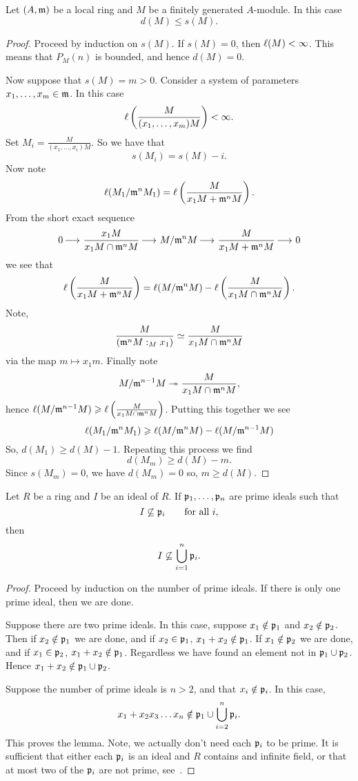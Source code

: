 \documentclass{ximera}
\begin{document}
\begin{lemma}[$\boldsymbol{d(M)\le s(M)}$]\label{L:ds}
  Let $(A,\mathfrak{m})$ be a local ring and $M$ be a finitely generated
  $A$-module. In this case
  \[
  d(M)\le s(M).
  \]
  \begin{proof}
    Proceed by induction on $s(M)$. If $s(M) = 0$, then
    $\ell(M)< \infty$. This means that $P_M(n)$ is bounded, and hence
    $d(M) = 0$.

    Now suppose that $s(M) = m >0$. Consider a system of
    parameters $x_1,\dots, x_m\in \mathfrak{m}$. In this case
    \[
    \ell\left( \frac{M}{(x_1,\dots,x_m)M} \right)<\infty.
    \]
    Set $M_i = \frac{M}{(x_1,\dots,x_i)M}$. So we have that
    \[
    s(M_i) = s(M)-i.
    \]
    Now note
    \[
    \ell(M_1/\mathfrak{m}^n M_1) = \ell\left(\frac{M}{x_1 M + \mathfrak{m}^n M}\right).
    \]
    From the short exact sequence
    \[
    0\mathop{\longrightarrow\,}\limits \frac{x_1M}{x_1 M \cap \mathfrak{m}^n M} \mathop{\longrightarrow\,}\limits  M/\mathfrak{m}^n M \mathop{\longrightarrow\,}\limits \frac{M}{x_1 M + \mathfrak{m}^n M}\mathop{\longrightarrow\,}\limits 0
    \]
    we see that
    \[
    \ell\left(\frac{M}{x_1 M + \mathfrak{m}^n M}\right) = \ell(M/\mathfrak{m}^n M) - \ell \left(\frac{M}{x_1 M \cap \mathfrak{m}^n M}\right).
    \]
    Note,
    \[
    \frac{M}{(\mathfrak{m}^nM:_M x_1)}\simeq \frac{M}{x_1 M \cap \mathfrak{m}^n M}
    \]
    via the map $m\mapsto x_1 m$. Finally note
    \[
    M/\mathfrak{m}^{n-1}M \twoheadrightarrow \frac{M}{x_1 M \cap \mathfrak{m}^n M},
    \]
    hence $\ell(M/\mathfrak{m}^{n-1}M)\geqslant \ell\left(\frac{M}{x_1 M \cap \mathfrak{m}^n
      M}\right)$. Putting this together we see
    \[
    \ell(M_1/\mathfrak{m}^n M_1) \geqslant \ell(M/\mathfrak{m}^n M) - \ell(M/\mathfrak{m}^{n-1}M)
    \]
    So, $d(M_1) \ge d(M) - 1$. Repeating this process we find
    \[
    d(M_m) \ge d(M) -m.
    \]
    Since $s(M_m) = 0$, we have $d(M_m) = 0$ so, $m\ge d(M)$.
  \end{proof}
\end{lemma}





\begin{lemma}\label{L:PA}
Let $R$ be a ring and $I$ be an ideal of $R$.  If $\mathfrak{p}_1,\ldots,\mathfrak{p}_n$
are prime ideals such that
\[
I \not\subseteq \mathfrak{p}_i \qquad\text{for all $i$,}
\]
then 
\[
I \not\subseteq \bigcup_{i = 1}^n \mathfrak{p}_i.
\]
\begin{proof}
  Proceed by induction on the number of prime ideals. If there is only
  one prime ideal, then we are done.

  Suppose there are two prime ideals. In this case, suppose
  $x_1\notin\mathfrak{p}_1$ and $x_2\notin\mathfrak{p}_2$. Then if $x_2\notin \mathfrak{p}_1$ we
  are done, and if $x_2\in \mathfrak{p}_1$, $x_1+x_2\notin \mathfrak{p}_1$.  If $x_1\notin
  \mathfrak{p}_2$ we are done, and if $x_1\in \mathfrak{p}_2$, $x_1+x_2\notin
  \mathfrak{p}_1$. Regardless we have found an element not in $\mathfrak{p}_1\cup \mathfrak{p}_2$.
  Hence $x_1+x_2\notin\mathfrak{p}_1\cup\mathfrak{p}_2$.
  
  Suppose the number of prime ideals is $n>2$, and that
  $x_i\notin\mathfrak{p}_i$. In this case,
  \[
  x_1+ x_2x_3\dots x_n \notin \mathfrak{p}_1\cup \bigcup_{i=2}^n \mathfrak{p}_i.
  \]
  This proves the lemma. Note, we actually don't need each $\mathfrak{p}_i$ to
  be prime. It is sufficient that either each $\mathfrak{p}_i$ is an ideal and
  $R$ contains and infinite field, or that at most two of the $\mathfrak{p}_i$
  are not prime, see~\cite{dE1995}.
\end{proof}
\end{lemma}
\end{document}
